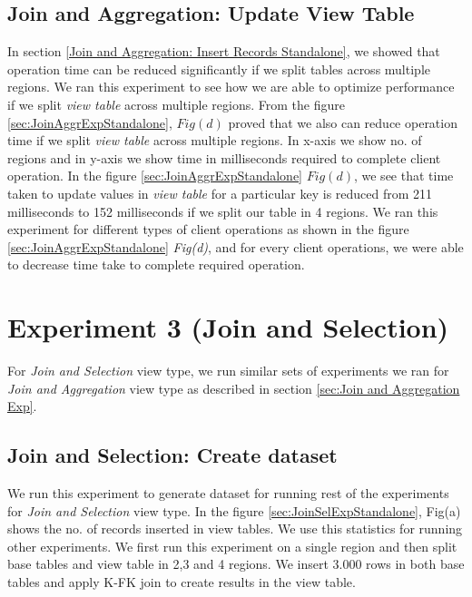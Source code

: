 \documentclass[11pt,a4paper,bibtotoc,idxtotoc,headsepline,footsepline,footexclude,BCOR12mm,DIV13]{scrbook}
\begin{document}
\subsection{Join and Aggregation: Update View Table} 
\label{Join and Aggr: Update View Table Standalone}

In section \ref{Join and Aggregation: Insert Records Standalone}, we showed that operation time can be reduced significantly if we split tables across multiple regions. We ran this experiment to see how we are able to optimize performance if we split \emph{view table} across multiple regions. From the figure \ref{sec:JoinAggrExpStandalone}, $Fig(d)$ proved that we also can reduce operation time if we split \emph{view table} across multiple regions. In x-axis we show no. of regions and in y-axis we show time in milliseconds required to complete client operation. In the figure \ref{sec:JoinAggrExpStandalone} $Fig(d)$, we see that time taken to update values in \emph{view table} for a particular key is reduced from 211 milliseconds to 152 milliseconds if we split our table in 4 regions. We ran this experiment for different types of client operations as shown in the figure \ref{sec:JoinAggrExpStandalone} \emph{Fig(d)}, and for every client operations, we were able to decrease time take to complete required operation.

\section{Experiment 3 (Join and Selection)}
\label{sec:Join and Selection Exp Standalone} 


For \emph{Join and Selection} view type, we run similar sets of experiments we ran for \emph{Join and Aggregation} view type as described in section \ref{sec:Join and Aggregation Exp}.

\subsection{Join and Selection: Create dataset}
\label{Join and Selection: Insert records Standalone}

We run this experiment to generate dataset for running rest of the experiments for \emph{Join and Selection} view type. In the figure \ref{sec:JoinSelExpStandalone}, Fig(a) shows the no. of records inserted in view tables. We use this statistics for running other experiments. We first run this experiment on a single region and then split base tables and view table in 2,3 and 4 regions. We insert 3.000 rows in both base tables and apply K-FK join to create results in the view table.
\end{document}
